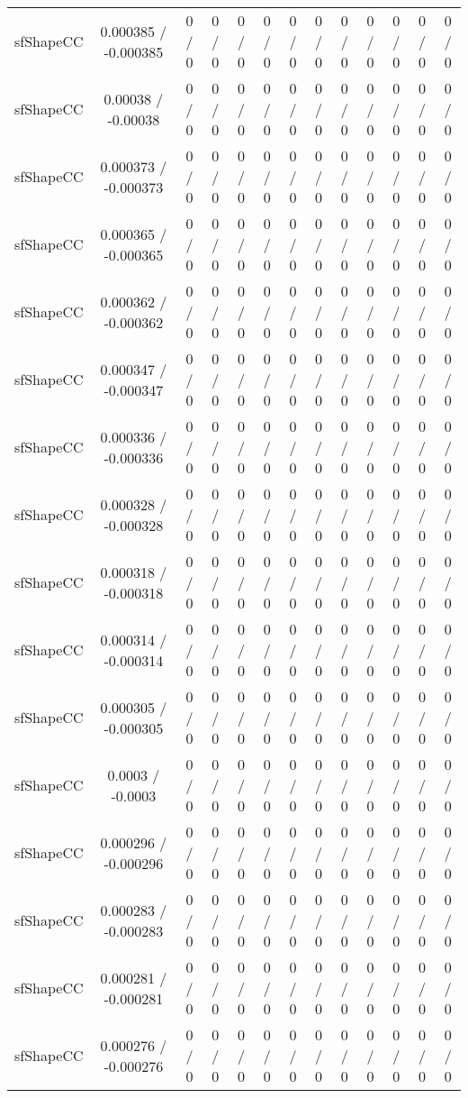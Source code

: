 \documentclass[10pt]{article}
\begin{document}
\begin{table}[htbp]
\begin{center}
\begin{tabular}{|c|c|c|c|c|c|c|c|c|c|c|c|c|}
  sfShapeCC & 0.000385 / -0.000385 & 0 / 0 & 0 / 0 & 0 / 0 & 0 / 0 & 0 / 0 & 0 / 0 & 0 / 0 & 0 / 0 & 0 / 0 & 0 / 0 & 0 / 0 \\ 
  sfShapeCC & 0.00038 / -0.00038 & 0 / 0 & 0 / 0 & 0 / 0 & 0 / 0 & 0 / 0 & 0 / 0 & 0 / 0 & 0 / 0 & 0 / 0 & 0 / 0 & 0 / 0 \\ 
  sfShapeCC & 0.000373 / -0.000373 & 0 / 0 & 0 / 0 & 0 / 0 & 0 / 0 & 0 / 0 & 0 / 0 & 0 / 0 & 0 / 0 & 0 / 0 & 0 / 0 & 0 / 0 \\ 
  sfShapeCC & 0.000365 / -0.000365 & 0 / 0 & 0 / 0 & 0 / 0 & 0 / 0 & 0 / 0 & 0 / 0 & 0 / 0 & 0 / 0 & 0 / 0 & 0 / 0 & 0 / 0 \\ 
  sfShapeCC & 0.000362 / -0.000362 & 0 / 0 & 0 / 0 & 0 / 0 & 0 / 0 & 0 / 0 & 0 / 0 & 0 / 0 & 0 / 0 & 0 / 0 & 0 / 0 & 0 / 0 \\ 
  sfShapeCC & 0.000347 / -0.000347 & 0 / 0 & 0 / 0 & 0 / 0 & 0 / 0 & 0 / 0 & 0 / 0 & 0 / 0 & 0 / 0 & 0 / 0 & 0 / 0 & 0 / 0 \\ 
  sfShapeCC & 0.000336 / -0.000336 & 0 / 0 & 0 / 0 & 0 / 0 & 0 / 0 & 0 / 0 & 0 / 0 & 0 / 0 & 0 / 0 & 0 / 0 & 0 / 0 & 0 / 0 \\ 
  sfShapeCC & 0.000328 / -0.000328 & 0 / 0 & 0 / 0 & 0 / 0 & 0 / 0 & 0 / 0 & 0 / 0 & 0 / 0 & 0 / 0 & 0 / 0 & 0 / 0 & 0 / 0 \\ 
  sfShapeCC & 0.000318 / -0.000318 & 0 / 0 & 0 / 0 & 0 / 0 & 0 / 0 & 0 / 0 & 0 / 0 & 0 / 0 & 0 / 0 & 0 / 0 & 0 / 0 & 0 / 0 \\ 
  sfShapeCC & 0.000314 / -0.000314 & 0 / 0 & 0 / 0 & 0 / 0 & 0 / 0 & 0 / 0 & 0 / 0 & 0 / 0 & 0 / 0 & 0 / 0 & 0 / 0 & 0 / 0 \\ 
  sfShapeCC & 0.000305 / -0.000305 & 0 / 0 & 0 / 0 & 0 / 0 & 0 / 0 & 0 / 0 & 0 / 0 & 0 / 0 & 0 / 0 & 0 / 0 & 0 / 0 & 0 / 0 \\ 
  sfShapeCC & 0.0003 / -0.0003 & 0 / 0 & 0 / 0 & 0 / 0 & 0 / 0 & 0 / 0 & 0 / 0 & 0 / 0 & 0 / 0 & 0 / 0 & 0 / 0 & 0 / 0 \\ 
  sfShapeCC & 0.000296 / -0.000296 & 0 / 0 & 0 / 0 & 0 / 0 & 0 / 0 & 0 / 0 & 0 / 0 & 0 / 0 & 0 / 0 & 0 / 0 & 0 / 0 & 0 / 0 \\ 
  sfShapeCC & 0.000283 / -0.000283 & 0 / 0 & 0 / 0 & 0 / 0 & 0 / 0 & 0 / 0 & 0 / 0 & 0 / 0 & 0 / 0 & 0 / 0 & 0 / 0 & 0 / 0 \\ 
  sfShapeCC & 0.000281 / -0.000281 & 0 / 0 & 0 / 0 & 0 / 0 & 0 / 0 & 0 / 0 & 0 / 0 & 0 / 0 & 0 / 0 & 0 / 0 & 0 / 0 & 0 / 0 \\ 
  sfShapeCC & 0.000276 / -0.000276 & 0 / 0 & 0 / 0 & 0 / 0 & 0 / 0 & 0 / 0 & 0 / 0 & 0 / 0 & 0 / 0 & 0 / 0 & 0 / 0 & 0 / 0 \\ 

\end{tabular}
\end{center}
\end{table}
\end{document}
